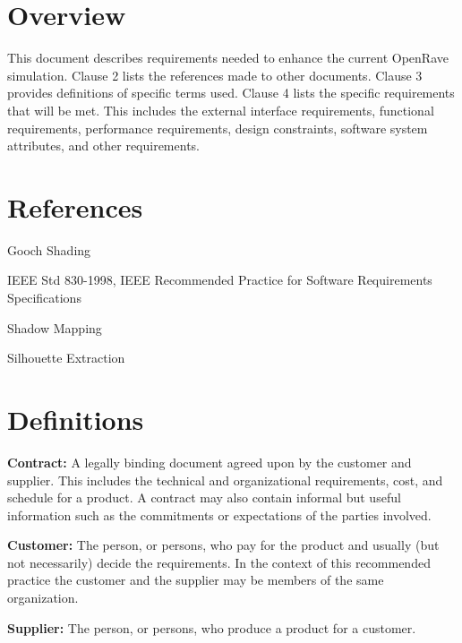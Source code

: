 \documentclass[10pt,journal,compsoc,draftclsnofoot]{IEEEtran}
\begin{document}
\newpage
\begin{flushleft}
\section{Overview}
\vspace{3mm}
This document describes requirements needed to enhance the current OpenRave simulation. 
Clause 2 lists the references made to other documents. 
Clause 3 provides definitions of specific terms used.
Clause 4 lists the specific requirements that will be met.
This includes the external interface requirements, functional requirements, performance requirements, design constraints, software system attributes, and other requirements.

\section{References}
\vspace{3mm}

Gooch Shading 
\vspace{3mm}

IEEE Std 830-1998, IEEE Recommended Practice for Software Requirements Specifications 
\vspace{3mm}

Shadow Mapping 
\vspace{3mm}

Silhouette Extraction 

\section{Definitions}

\vspace{3mm}
\textbf{Contract:}
A legally binding document agreed upon by the customer and supplier. This includes the technical and organizational requirements, cost, and schedule for a product. A contract may also contain informal but useful information such as the commitments or expectations of the parties involved.

\vspace{3mm}
\textbf{Customer:}
The person, or persons, who pay for the product and usually (but not necessarily) decide the requirements. In the context of this recommended practice the customer and the supplier may be members of the same organization.

\vspace{3mm}
\textbf{Supplier:}
The person, or persons, who produce a product for a customer.


\end{flushleft}
\end{document}
